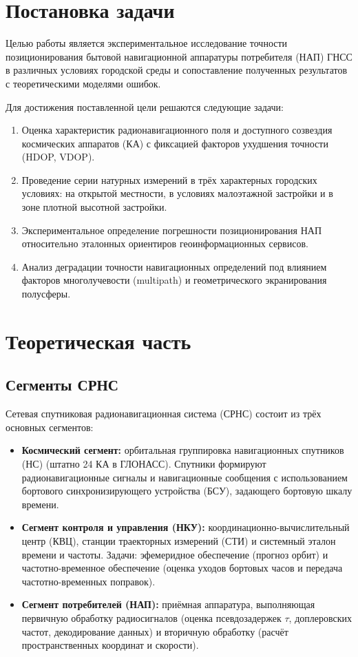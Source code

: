 \section{Постановка задачи}

Целью работы является экспериментальное исследование точности позиционирования бытовой навигационной аппаратуры потребителя (НАП) ГНСС в различных условиях городской среды и сопоставление полученных результатов с теоретическими моделями ошибок.

Для достижения поставленной цели решаются следующие задачи:
\begin{enumerate}
    \item Оценка характеристик радионавигационного поля и доступного созвездия космических аппаратов (КА) с фиксацией факторов ухудшения точности (HDOP, VDOP).
    \item Проведение серии натурных измерений в трёх характерных городских условиях: на открытой местности, в условиях малоэтажной застройки и в зоне плотной высотной застройки.
    \item Экспериментальное определение погрешности позиционирования НАП относительно эталонных ориентиров геоинформационных сервисов.
    \item Анализ деградации точности навигационных определений под влиянием факторов многолучевости (multipath) и геометрического экранирования полусферы.
\end{enumerate}

\section{Теоретическая часть}

\subsection{Сегменты СРНС}
Сетевая спутниковая радионавигационная система (СРНС) состоит из трёх основных сегментов:
\begin{itemize}
    \item \textbf{Космический сегмент:} орбитальная группировка навигационных спутников (НС) (штатно 24 КА в ГЛОНАСС). Спутники формируют радионавигационные сигналы и навигационные сообщения с использованием бортового синхронизирующего устройства (БСУ), задающего бортовую шкалу времени.
    \item \textbf{Сегмент контроля и управления (НКУ):} координационно-вычислительный центр (КВЦ), станции траекторных измерений (СТИ) и системный эталон времени и частоты. Задачи: эфемеридное обеспечение (прогноз орбит) и частотно-временное обеспечение (оценка уходов бортовых часов и передача частотно-временных поправок).
    \item \textbf{Сегмент потребителей (НАП):} приёмная аппаратура, выполняющая первичную обработку радиосигналов (оценка псевдозадержек $\tau$, доплеровских частот, декодирование данных) и вторичную обработку (расчёт пространственных координат и скорости).
\end{itemize}

